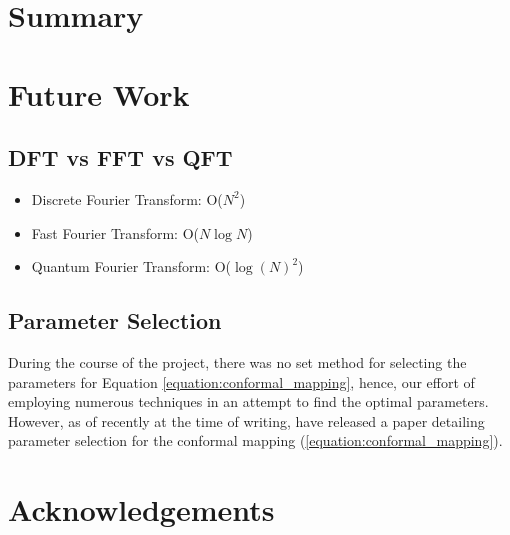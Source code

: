 \documentclass[a4paper]{report}
\begin{document}
\section{Summary}

\section{Future Work}

\subsection{DFT vs FFT vs QFT}
\begin{itemize}
	\item Discrete Fourier Transform: O($N^2$)
	\item Fast Fourier Transform: O($N\log N$)
	\item Quantum Fourier Transform: O($\log(N)^2$)	
\end{itemize}


\subsection{Parameter Selection}
During the course of the project, there was no set method for selecting the parameters for Equation \ref{equation:conformal_mapping}, hence, our effort of employing numerous techniques in an attempt to find the optimal parameters. However, as of recently at the time of writing, \citet{boyarchenko2024efficient} have released a paper detailing parameter selection for the conformal mapping (\ref{equation:conformal_mapping}).

\section{Acknowledgements}





\begin{appendices}

% 
    
\end{appendices}
\end{document}
